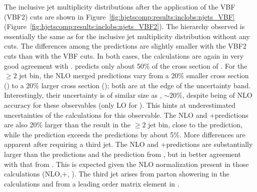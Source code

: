 The inclusive jet multiplicity distributions after the application of the VBF (VBF2)
cuts are shown in 
Figure~\ref{fig:hjetscomp:results:inclobs:njets_VBF} (Figure~\ref{fig:hjetscomp:results:inclobs:njets_VBF2}).
 The hierarchy observed
is essentially the same as for the inclusive jet multiplicity
distribution without any cuts. The differences among the predictions
are slightly smaller with the VBF2 cuts than with the VBF cuts. 
In both cases, the \NNLOPS calculations are again in very good agreement 
with \Sherpa \NNLOPS.
\Hej  predicts only about 50\% of the cross section of  
\NNLOPS. 
For the $\ge 2$ jet bin, the NLO merged predictions vary from a 20\% 
smaller cross section (\MGaMC) to a 20\% larger cross section 
(\Sherpa \MEPSatNLO); both are at the edge of 
the \NNLOPS uncertainty band. Interestingly, their uncertainty is of 
similar size as  \NNLOPS, $\sim$20\%, despite being of NLO 
accuracy for these observables (only LO for \NNLOPS). This hints 
at  underestimated uncertainties of the \NNLOPS calculations for 
this observable. The NLO and \Minlo \GoSam{}+\Sherpa predictions are 
also 20\% larger than the \NNLOPS result in the $\ge 2$ jet bin, close to the \Sherpa \MEPSatNLO 
prediction, while the \Loopsim prediction exceeds the \NNLOPS predictions 
by about 5\%. 
More differences are apparent after requiring a third jet. The  
NLO and \Minlo \GoSam{}+\Sherpa predictions are substantially larger than the 
\NNLOPS predictions and the prediction from \MGaMC, but in better agreement
with that from \Sherpa \MEPSatNLO. This is expected given the NLO normalization
present in those calculations (NLO,\Minlo \GoSam{}+\Sherpa, \Sherpa \NNLOPS). The third jet  arises
from parton showering in the \NNLOPS calculations and from a leading order matrix element in \MGaMC.

